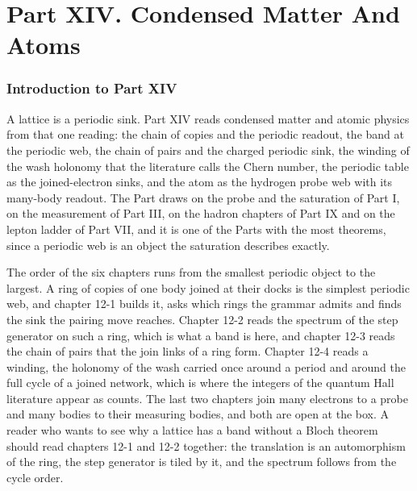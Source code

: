 \clearpage
\part*{Part XIV. Condensed Matter And Atoms}
\label{atlaspart:14-condensed-matter-and-atoms}
\section*{Introduction to Part XIV}\label{narr:part:XII}
A lattice is a periodic sink. Part XIV reads condensed matter and atomic physics from that one reading: the chain of copies and the periodic readout, the band at the periodic web, the chain of pairs and the charged periodic sink, the winding of the wash holonomy that the literature calls the Chern number, the periodic table as the joined-electron sinks, and the atom as the hydrogen probe web with its many-body readout. The Part draws on the probe and the saturation of Part I, on the measurement of Part III, on the hadron chapters of Part IX and on the lepton ladder of Part VII, and it is one of the Parts with the most theorems, since a periodic web is an object the saturation describes exactly.

The order of the six chapters runs from the smallest periodic object to the largest. A ring of copies of one body joined at their docks is the simplest periodic web, and chapter 12-1 builds it, asks which rings the grammar admits and finds the sink the pairing move reaches. Chapter 12-2 reads the spectrum of the step generator on such a ring, which is what a band is here, and chapter 12-3 reads the chain of pairs that the join links of a ring form. Chapter 12-4 reads a winding, the holonomy of the wash carried once around a period and around the full cycle of a joined network, which is where the integers of the quantum Hall literature appear as counts. The last two chapters join many electrons to a probe and many bodies to their measuring bodies, and both are open at the box. A reader who wants to see why a lattice has a band without a Bloch theorem should read chapters 12-1 and 12-2 together: the translation is an automorphism of the ring, the step generator is tiled by it, and the spectrum follows from the cycle order.

